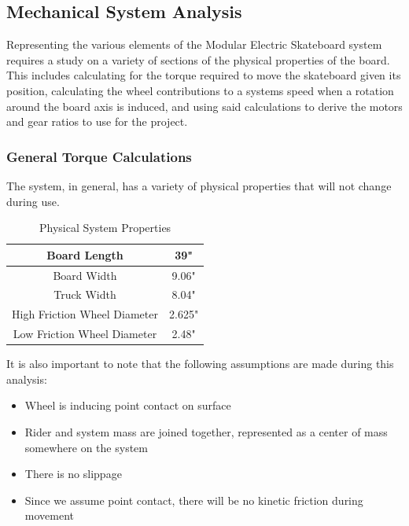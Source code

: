 \documentclass[titlepage, letterpaper,12pt]{article}
\begin{document}
\subsection{Mechanical System Analysis}
Representing the various elements of the Modular Electric Skateboard system requires a study on a variety of sections of the physical properties of the board. This includes calculating for the torque required to move the skateboard given its position, calculating the wheel contributions to a systems speed when a rotation around the board axis is induced, and using said calculations to derive the motors and gear ratios to use for the project.
\subsubsection{General Torque Calculations}
The system, in general, has a variety of physical properties that will not change during use.

\begin{table}[h]
\caption{Physical System Properties}
\begin{center}
 \begin{tabular}{||c c||}
 \hline
 Board Length & 39" \\
 \hline
 Board Width & 9.06" \\
 \hline
 Truck Width & 8.04" \\
 \hline
 High Friction Wheel Diameter & 2.625" \\
 \hline
 Low Friction Wheel Diameter & 2.48" \\
 \hline
\end{tabular}
\end{center}
\label{table:phys}
\end{table}

It is also important to note that the following assumptions are made during this analysis:
\begin{itemize}
    \item Wheel is inducing point contact on surface
    \item Rider and system mass are joined together, represented as a center of mass somewhere on the system
    \item There is no slippage
    \item Since we assume point contact, there will be no kinetic friction during movement
\end{itemize}
\end{document}
